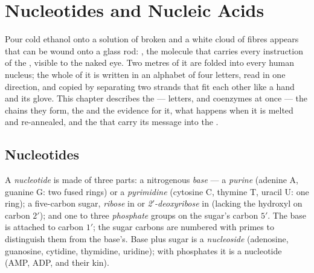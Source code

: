 \chapter{Nucleotides and Nucleic Acids}\label{ch:b1:nucleic-acids}

Pour cold ethanol onto a solution of broken  and a white cloud of
fibres appears that can be wound onto a glass rod: , the molecule
that carries every instruction of the , visible to the naked
eye. Two metres of it are folded into every human nucleus; the whole of
it is written in an alphabet of four letters, read in one direction,
and copied by separating two strands that fit each other like a hand
and its glove. This chapter describes the  --- letters,
 and coenzymes at once --- the chains they form, the
 and the evidence for it, what happens when it is melted
and re-annealed, and the  that carry its message into the .

\section{Nucleotides}

\begin{definition}[Nucleotide]\label{def:b1:nucleic-acids:nucleotide}
A \emph{nucleotide} is made of three parts: a
nitrogenous \emph{base} --- a
\emph{purine} (adenine A, guanine G: two fused rings) or a
\emph{pyrimidine} (cytosine C, thymine T, uracil U:
one ring); a five-carbon sugar, \emph{ribose} in  or
\emph{2$'$-deoxyribose} in  (lacking the hydroxyl on carbon
$2'$); and one to three \emph{phosphate} groups on the sugar's carbon
$5'$. The base is attached to carbon $1'$; the sugar carbons are
numbered with primes to distinguish them from the base's. Base plus
sugar is a \emph{nucleoside} (adenosine, guanosine, cytidine,
thymidine, uridine); with phosphates it is a nucleotide (AMP, ADP, 
and their kin).
\end{definition}

